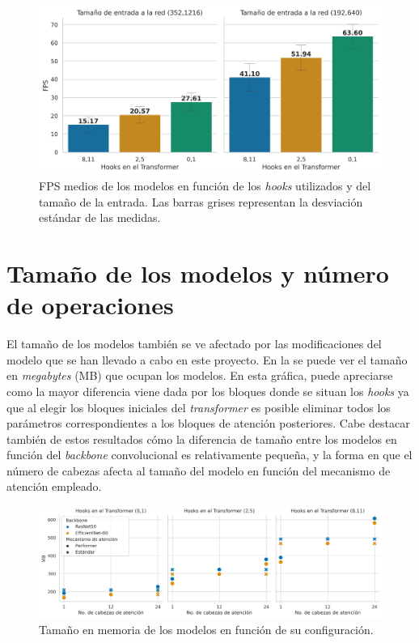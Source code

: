 \begin{figure}[H]
\centering
\includegraphics[width=0.85\linewidth]{imagenes/Resultados/velocidad_inferencia_hooks.png} 
\captionsetup{width=.9\linewidth}
\caption{FPS medios de los modelos en función de los \textit{hooks} utilizados y del tamaño de la entrada. Las barras grises representan la desviación estándar de las medidas.}
\label{fig:resultados-inf-hooks}
\end{figure}















\section{Tamaño de los modelos y número de operaciones}
El tamaño de los modelos también se ve afectado por las modificaciones del modelo que se han llevado a cabo en este proyecto. En la  se puede ver el tamaño en \textit{megabytes} (MB) que ocupan los modelos. En esta gráfica, puede apreciarse como la mayor diferencia viene dada por los bloques donde se situan los \textit{hooks} ya que al elegir los bloques iniciales del \textit{transformer} es posible eliminar todos los parámetros correspondientes a los bloques de atención posteriores. Cabe destacar también de estos resultados cómo la diferencia de tamaño entre los modelos en función del \textit{backbone} convolucional es relativamente pequeña, y la forma en que el número de cabezas afecta al tamaño del modelo en función del mecanismo de atención empleado.


\begin{figure}[H]
\centering
\includegraphics[width=\linewidth]{imagenes/Resultados/mb.png} 
\captionsetup{width=0.95\linewidth}
\caption{Tamaño en memoria de los modelos en función de su configuración.}
\label{fig:resultados-mb}
\end{figure}


